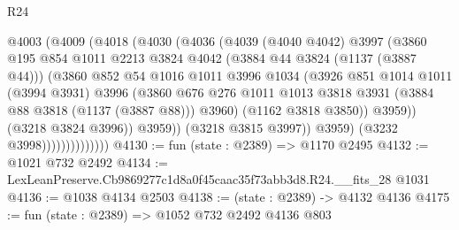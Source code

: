 \begin{lexlean}{R24}
\begin{coremodule}
                            @4003
                              (@4009
                                (@4018
                                  (@4030
                                    (@4036
                                      (@4039
                                        (@4040 @4042)
                                        @3997
                                        (@3860
                                          @195
                                          @854
                                          @1011
                                          @2213
                                          @3824
                                          @4042
                                          (@3884 @44 @3824 (@1137 (@3887 @44)))
                                          (@3860
                                            @852
                                            @54
                                            @1016
                                            @1011
                                            @3996
                                            @1034
                                            (@3926
                                              @851
                                              @1014
                                              @1011
                                              (@3994 @3931)
                                              @3996
                                              (@3860
                                                @676
                                                @276
                                                @1011
                                                @1013
                                                @3818
                                                @3931
                                                (@3884 @88 @3818 (@1137 (@3887 @88)))
                                                @3960)
                                              (@1162 @3818 @3850))
                                            @3959))
                                        (@3218 @3824 @3996))
                                      @3959))
                                  (@3218 @3815 @3997))
                                @3959)
                              (@3232 @3998))))))))))))))
@4130 := fun (state : @2389) => @1170 @2495
@4132 := @1021 @732 @2492
@4134 := LexLeanPreserve.Cb9869277c1d8a0f45caac35f73abb3d8.R24.__fits_28 @1031
@4136 := @1038 @4134 @2503
@4138 := (state : @2389) -> @4132 @4136
@4175 := fun (state : @2389) =>
  @1052
    @732
    @2492
    @4136
    @803

\end{coremodule}
\end{lexlean}
